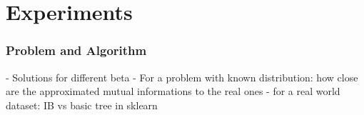 \section{Experiments} %

\begin{frame}
\frametitle{Problem and Algorithm}
    - Solutions for different beta
    - For a problem with known distribution: how close are the approximated mutual informations to the real ones
    - for a real world dataset: IB vs basic tree in sklearn

\end{frame}